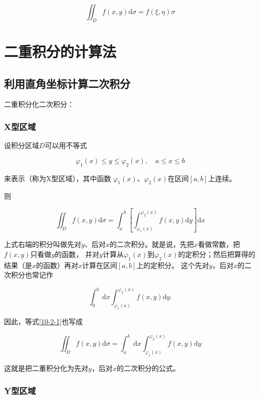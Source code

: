 \documentclass[12pt, a4paper]{article}
\numberwithin{equation}{section}
\begin{document}
    $$
        \iint_D f(x, y) \mathrm{d} \sigma=f(\xi, \eta) \sigma
    $$

\section{二重积分的计算法}

\subsection{利用直角坐标计算二次积分}

    二重积分化二次积分：

\subsubsection{X型区域}

    设积分区域$D$可以用不等式

    $$
        \varphi_1(x) \leq y \leq \varphi_2(x), \quad a \leq x \leq b
    $$

    来表示（称为X型区域），其中函数 $\varphi_1(x)$、$\varphi_2(x)$在区间$[a, b]$上连续。

    则

    \begin{equation}
        \iint_D f(x, y) \mathrm{d} \sigma=\int_a^b\left[\int_{\varphi_1(x)}^{\varphi_2(x)} f(x, y) \mathrm{d} y\right] \mathrm{d} x
        \label{10-2-1}
    \end{equation}

    上式右端的积分叫做先对$y$、后对$x$的二次积分。就是说，先把$x$看做常数，把$f(x, y)$只看做$y$的函数，
    并对$y$计算从$\varphi_1(x)$到$\varphi_2(x)$的定积分；然后把算得的结果（是$x$的函数）再对$x$计算在区间$[a, b]$上的定积分。
    这个先对$y$，后对$x$的二次积分也常记作
    
    $$
        \int_0^b \mathrm{~d} x \int_{\varphi_1(x)}^{\varphi_2(x)} f(x, y) \mathrm{d} y .
    $$

    因此，等式\ref{10-2-1}也写成

    \begin{equation}
        \iint_D f(x, y) \mathrm{d} \sigma=\int_a^b \mathrm{~d} x \int_{\varphi_1(x)}^{\varphi_2(x)} f(x, y) \mathrm{d} y
        \label{10-2-2}
    \end{equation}

    这就是把二重积分化为先对$y$，后对$x$的二次积分的公式。

\subsubsection{Y型区域}
\end{document}
